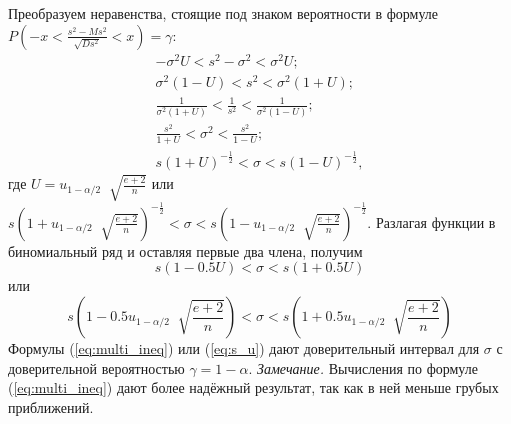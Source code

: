 Преобразуем неравенства, стоящие под знаком вероятности в формуле
\newline
$P\left(-x < \frac{s^{2}-Ms^{2}}{\sqrt{D s^{2}}} < x\right) = \gamma$:
\begin{equation}
	\begin{split}
		-\sigma^{2}U < s^{2} -\sigma^{2} < \sigma^{2}U; \\
		\sigma^{2}(1-U) < s^{2} < \sigma^{2}(1 + U); \\
		\frac{1}{\sigma^{2}(1 + U)} < \frac{1}{s^{2}} < \frac{1}{\sigma^{2}(1-U)};\\
		\frac{s^{2}}{1 + U} < \sigma^{2} < \frac{s^{2}}{1 - U};\\
		s(1 + U)^{-\frac{1}{2}} < \sigma < s(1-U)^{-\frac{1}{2}},
	\end{split}
	\label{eq:multi_ineq}
\end{equation}
где $U = u_{1-\alpha/2}︀\sqrt{\frac{e + 2}{n}}$ или
\newline
$s(1 +  u_{1-\alpha/2}︀\sqrt{\frac{e + 2}{n}})^{-\frac{1}{2}} <\sigma < s(1-u_{1-\alpha/2}︀\sqrt{\frac{e + 2}{n}})^{-\frac{1}{2}}$.
\newline
Разлагая функции в биномиальный ряд и оставляя первые два члена, получим
\begin{equation}
	s(1-0.5U) < \sigma < s(1 + 0.5U)
	\label{eq:s_U}
\end{equation}
или
\begin{equation}
	s(1-0.5u_{1-\alpha/2}︀\sqrt{\frac{e + 2}{n}}) < \sigma < s(1 + 0.5 u_{1-\alpha/2}︀\sqrt{\frac{e + 2}{n}})
	\label{eq:s_u}
\end{equation}
Формулы (\ref{eq:multi_ineq}) или (\ref{eq:s_u}) дают доверительный интервал для $\sigma$ с доверительной вероятностью $\gamma = 1-\alpha$. 
\newline
\textit{Замечание.} Вычисления по формуле (\ref{eq:multi_ineq}) дают более надёжный результат, так как в ней меньше грубых приближений.

\newpage
